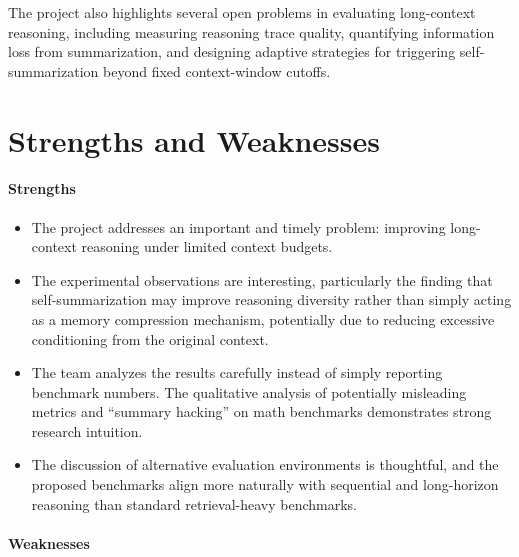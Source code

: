 \documentclass{article}
\begin{document}
The project also highlights several open problems in evaluating long-context reasoning, including measuring reasoning trace quality, quantifying information loss from summarization, and designing adaptive strategies for triggering self-summarization beyond fixed context-window cutoffs.
\section{Strengths and Weaknesses}

\paragraph{Strengths}
\begin{itemize}
    \item The project addresses an important and timely problem: improving long-context reasoning under limited context budgets.
    
    \item The experimental observations are interesting, particularly the finding that self-summarization may improve reasoning diversity rather than simply acting as a memory compression mechanism, potentially due to reducing excessive conditioning from the original context.
    
    \item The team analyzes the results carefully instead of simply reporting benchmark numbers. The qualitative analysis of potentially misleading metrics and ``summary hacking'' on math benchmarks demonstrates strong research intuition.
    
    \item The discussion of alternative evaluation environments is thoughtful, and the proposed benchmarks align more naturally with sequential and long-horizon reasoning than standard retrieval-heavy benchmarks.
\end{itemize}

\paragraph{Weaknesses}
\end{document}
